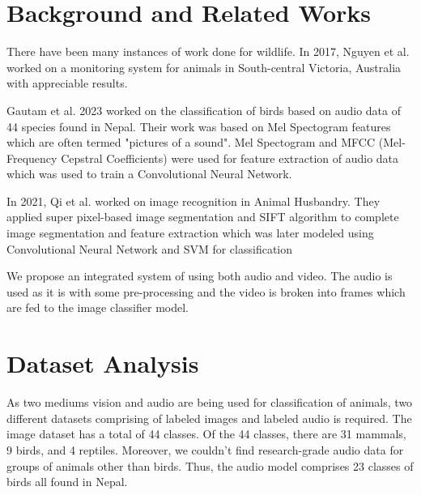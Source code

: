 \documentclass[fleqn, 10pt, twoside]{IOEGC}
\begin{document}
\section{Background and Related Works}
There have been many instances of work done for wildlife. In 2017, Nguyen et al.\cite{r4} worked on a monitoring system for animals in South-central Victoria, Australia with appreciable results.
\par
Gautam et al. 2023 \cite{r5} worked on the classification of birds based on audio data of 44 species found in Nepal. Their work was based on Mel Spectogram features which are often termed "pictures of a sound". Mel Spectogram and MFCC (Mel-Frequency Cepstral Coefficients) were used for feature extraction of audio data which was used to train a Convolutional Neural Network.
\par
In 2021, Qi et al. \cite{r6} worked on image recognition in Animal Husbandry. They applied super pixel-based image segmentation and SIFT algorithm to complete image segmentation and feature extraction which was later modeled using Convolutional Neural Network and SVM for classification
\par
We propose an integrated system of using both audio and video. The audio is used as it is with some pre-processing and the video is broken into frames which are fed to the image classifier model.

\section{Dataset Analysis}
As two mediums vision and audio are being used for classification of animals, two different datasets comprising of labeled images and labeled audio is required.
The image dataset has a total of 44 classes. Of the 44 classes, there are 31 mammals, 9 birds, and 4 reptiles. Moreover, we couldn’t find research-grade audio data for groups of animals other than birds. Thus, the audio model comprises 23 classes of birds all found in Nepal.
\end{document}
